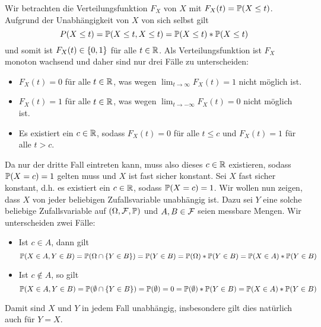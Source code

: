 \begin{exercisePage}
	\begin{proof-equivalence}[]
		\hinrichtung Wir betrachten die Verteilungsfunktion $F_X$ von $X$ mit $F_X(t) = \P(X \le t)$. Aufgrund der Unabhängigkeit von $X$ von sich selbst gilt
		\begin{equation*}
			P(X \leq t) = \P(X \le t , X \le t) = \P(X \le t) * \P(X \le t)
		\end{equation*}
		und somit ist $F_X(t) \in \menge{0,1}$ für alle $t \in \R$. Als Verteilungsfunktion ist $F_X$ monoton wachsend und daher sind nur drei Fälle zu unterscheiden:
		\begin{itemize}[leftmargin=*, nolistsep]
			\item $F_X(t) = 0$ für alle $t \in \R$, was wegen $\lim_{t \to \infty} F_X(t) = 1$ nicht möglich ist.
			\item $F_X(t) = 1$ für alle $t \in \R$, was wegen $\lim_{t \to -\infty} F_X(t) = 0$ nicht möglich ist.
			\item Es existiert ein $c \in \R$, sodass $F_X(t) = 0$ für alle $t \leq c$ und $F_X(t) = 1$ für alle $t > c$.
		\end{itemize}
		Da nur der dritte Fall eintreten kann, muss also dieses $c \in \R$ existieren, sodass $\P(X=c) = 1$ gelten muss und $X$ ist fast sicher konstant.
		\rueckrichtung Sei $X$ fast sicher konstant, d.h. es existiert ein $c \in \R$, sodass $\P(X=c)=1$. Wir wollen nun zeigen, dass $X$ von jeder beliebigen Zufallsvariable unabhängig ist. Dazu sei $Y$ eine solche beliebige Zufallsvariable auf $(\Omega, \ereignisF, \P)$ und $A,B \in \ereignisF$ seien messbare Mengen. Wir unterscheiden zwei Fälle:
		\begin{itemize}[leftmargin=*, nolistsep]
			\item Ist $c \in A$, dann gilt
			\begin{equation*}
				\P(X \in A , Y \in B) = \P(\Omega \cap \menge{Y \in B}) = \P(Y \in B) = \P(\Omega) * \P(Y \in B) = \P(X \in A) * \P(Y \in B)
			\end{equation*}
			\item Ist $c \notin A$, so gilt
			\begin{equation*}
				\P(X \in A , Y \in B) = \P(\emptyset \cap \menge{Y \in B}) = \P(\emptyset) = 0 = \P(\emptyset) * \P(Y \in B) = \P(X \in A) * \P(Y \in B)
			\end{equation*}
		\end{itemize}
		Damit sind $X$ und $Y$ in jedem Fall unabhängig, insbesondere gilt dies natürlich auch für $Y=X$.
	\end{proof-equivalence}


\end{exercisePage}
